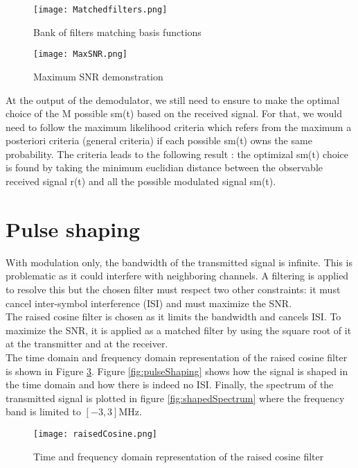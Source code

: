  \begin{figure}[H]
    \centering
    \texttt{[image: Matchedfilters.png]}
    \caption{Bank of filters matching basis functions}
    \label{fig:Matchedfilters}
\end{figure}

\begin{figure}[H]
    \centering
    \texttt{[image: MaxSNR.png]}
    \caption{Maximum SNR demonstration}
    \label{fig:MaxSNR}
\end{figure}

At the output of the demodulator, we still need to ensure to make the optimal choice of the M possible sm(t) based on the received signal.
For that, we would need to follow the maximum likelihood criteria which refers from the maximum a posteriori criteria (general criteria) if each possible sm(t) 
owns the same probability.
The criteria leads to the following result : the optimizal sm(t) choice is found by taking the minimum euclidian distance between the observable received signal r(t) 
and all the possible modulated signal sm(t).

\section{Pulse shaping}

With modulation only, the bandwidth of the transmitted signal is infinite. This is problematic as it could interfere with neighboring channels. A filtering is applied to resolve this but the chosen filter must respect two other constraints: it must cancel inter-symbol interference (ISI) and must maximize the SNR. \\
The raised cosine filter is chosen as it limits the bandwidth and cancels ISI. To maximize the SNR, it is applied as a matched filter by using the square root of it at the transmitter and at the receiver. \\
The time domain and frequency domain representation of the raised cosine filter is shown in Figure \ref{fig:raisedCosine}. Figure \ref{fig:pulseShaping} shows how the signal is shaped in the time domain and how there is indeed no ISI. Finally, the spectrum of the transmitted signal is plotted in figure \ref{fig:shapedSpectrum} where the frequency band is limited to $[-3, 3]$MHz. \\

\begin{figure}[H]
    \centering
    \texttt{[image: raisedCosine.png]}
    \caption{Time and frequency domain representation of the raised cosine filter}
    \label{fig:raisedCosine}
\end{figure}

